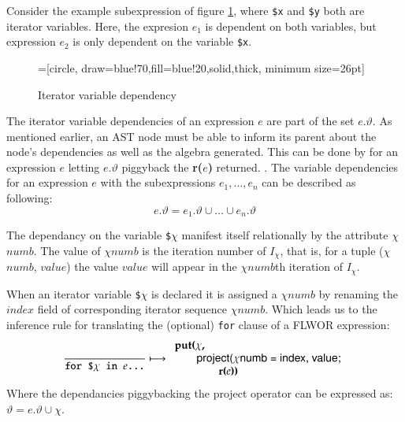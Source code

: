 Consider the example subexpression of figure \ref{fig:trans:td:varDep}, where \texttt{\$x} and \texttt{\$y} both
are iterator variables. Here, the expresion $e_{1}$ is dependent on both variables, but expression $e_{2}$ is only
dependent on the variable \texttt{\$x}.

\begin{figure}[h]
\centering
{}=[circle, draw=blue!70,fill=blue!20,solid,thick, minimum
size=26pt]
\label{fig:trans:td:varDep}
\caption[Iterator variable dependency]{Iterator variable dependency}
\end{figure}

The iterator variable dependencies of an expression $e$ are part of the set $e.\vartheta$. As mentioned earlier,
an AST node must be able to inform its parent about the node's dependencies as well as the algebra generated. This
can be done by for an expression $e$ letting $e.\vartheta$ piggyback the \textbf{r(}$e$\textbf{)} returned.
. The variable dependencies for an expression
$e$ with the subexpressions $e_{1},\ldots,e_{n}$ can be described as following:
\begin{equation*}
e.\vartheta = e_{1}.\vartheta\cup\ldots\cup e_{n}.\vartheta
\end{equation*}

The dependancy on the variable \texttt{\$}$\chi$ manifest itself relationally by the attribute $\chi$$numb$. The
value of $\chi$$numb$ is the iteration number of $I_{\chi}$, that is, for a tuple ($\chi$$numb$, $value$) the value
$value$ will appear in the $\chi$$numb$th iteration of $I_{\chi}$.

When an iterator variable \texttt{\$}$\chi$ is declared it is assigned a $\chi$$numb$ by renaming the $index$
field of corresponding iterator sequence $\chi$$numb$. Which leads us to the inference rule for translating the
(optional) \texttt{for} clause of a FLWOR expression:
\begin{equation}
\frac{}{\mbox{\texttt{for \$}}\chi \mbox{\texttt{ in }} e \mbox{\texttt{\ldots}}}\longmapsto
\begin{array}{l}
\mbox{\textbf{put(}}\chi\mbox{\textbf{, }} \\ \qquad
\mbox{\textsf{project(}}\chi\mbox{\textsf{numb = index, value;}} \\ \qquad \qquad
\mbox{\textbf{r(}}e\mbox{\textbf{))}}
\end{array}
\label{eq:trans:td:forclause}
\end{equation}
Where the dependancies piggybacking the \textsf{project} operator can be expressed as:
$\vartheta = e.\vartheta \cup \chi$.

